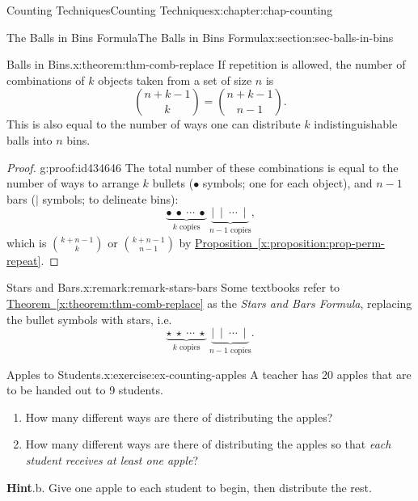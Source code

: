 \documentclass[oneside,10pt,]{book}
\newcommand{\blocktitlefont}{\relax}
\newcommand{\xreffont}{\relax}
\numberwithin{equation}{section}
\begin{document}
\begin{chapterptx}{Counting Techniques}{}{Counting Techniques}{}{}{x:chapter:chap-counting}
\begin{sectionptx}{The Balls in Bins Formula}{}{The Balls in Bins Formula}{}{}{x:section:sec-balls-in-bins}
\begin{theorem}{Balls in Bins.}{}{x:theorem:thm-comb-replace}
If repetition is allowed, the number of combinations of \(k\) objects taken from a set of size \(n\) is%
\begin{equation*}
\binom{n+k-1}{k} = \binom{n+k-1}{n-1}\text{.}
\end{equation*}
This is also equal to the number of ways one can distribute \(k\) indistinguishable balls into \(n\) bins.%
\end{theorem}
\begin{proof}{}{g:proof:id434646}
The total number of these combinations is equal to the number of ways to arrange \(k\) bullets (\(\bullet\) symbols; one for each object), and \(n-1\) bars (\(\mid\) symbols; to delineate bins):%
\begin{equation*}
\underbrace{\bullet \ \bullet \ \cdots \ \bullet}_{k \text{ copies}}\ \underbrace{\mid \ \mid \ \cdots \ \mid}_{n-1 \text{ copies}}\text{,}
\end{equation*}
which is \(\displaystyle\binom{k+n-1}{k}\) or \(\binom{k+n-1}{n-1}\) by \hyperref[x:proposition:prop-perm-repeat]{Proposition~{\xreffont\ref{x:proposition:prop-perm-repeat}}}.%
\end{proof}
\begin{remark}{Stars and Bars.}{x:remark:remark-stars-bars}%
Some textbooks refer to \hyperref[x:theorem:thm-comb-replace]{Theorem~{\xreffont\ref{x:theorem:thm-comb-replace}}} as the \emph{Stars and Bars Formula}, replacing the bullet symbols with stars, i.e.\@%
\begin{equation*}
\underbrace{\star \ \star \ \cdots \ \star}_{k \text{ copies}}\ \underbrace{\mid \ \mid \ \cdots \ \mid}_{n-1 \text{ copies}}\text{.}
\end{equation*}
%
\end{remark}
\begin{inlineexercise}{Apples to Students.}{x:exercise:ex-counting-apples}%
A teacher has 20 apples that are to be handed out to 9 students.%
\begin{enumerate}[label=(\alph*)]
\item{}How many different ways are there of distributing the apples?%
\item{}How many different ways are there of distributing the apples so that \emph{each student receives at least one apple}?%
\end{enumerate}
%
\par\smallskip%
\noindent\textbf{\blocktitlefont Hint}.\hypertarget{g:hint:id432481}{}\quad{}b. Give one apple to each student to begin, then distribute the rest.%
\end{inlineexercise}

\end{sectionptx}
\end{chapterptx}
\end{document}
